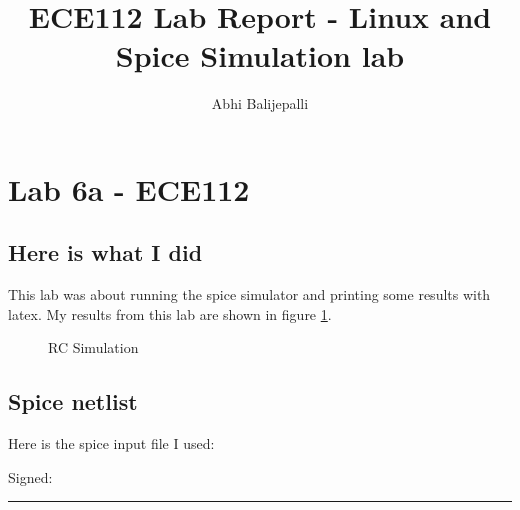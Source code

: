 \documentclass[11pt, oneside]{article}
\title{\vspace{-3.0cm}ECE112 Lab Report - Linux and Spice Simulation lab}
\author{Abhi Balijepalli}
\newcommand{\uline}[1]{\rule[0pt]{#1}{0.4pt}}%
\begin{document}
\maketitle

\section*{Lab 6a - ECE112}

\subsection*{Here is what I did}
 
This lab was about running the spice simulator and printing some results
with latex. My results from this lab are shown in figure \ref{fig:simplot}.

\begin{figure}[H]
\center
{}
\caption{\label{fig:simplot}RC Simulation}
\end{figure}

\subsection*{Spice netlist}

Here is the spice input file I used:
\vspace{3mm}


\vspace{3mm}
Signed: \hspace{1mm}
\uline{1.5in} \vspace{0.2in} \\
\end{document}
